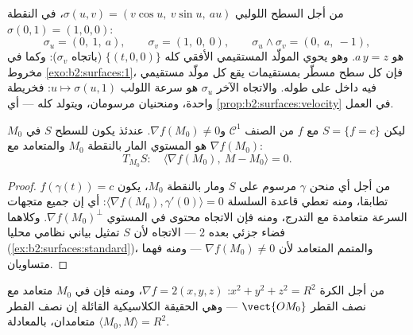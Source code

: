 \begin{example}
\label{ex:b2:surfaces:helicoidtangent}
من أجل السطح اللولبي $\sigma(u, v) = (v\cos u,\ v\sin u,\ au)$، في النقطة $\sigma(0, 1) = (1, 0, 0)$:
\[
\sigma_u = (0,\ 1,\ a), \qquad \sigma_v = (1,\ 0,\ 0),
\qquad
\sigma_u \wedge \sigma_v = (0,\ a,\ -1),
\]
 هو $a\,y = z$. وهو يحوي المولّد المستقيمي الأفقي كله
$\{(t, 0, 0)\}$ (باتجاه $\sigma_v$): وكما في مخروط \cref{exo:b2:surfaces:1}، فإن كل سطح مسطّر
بمستقيمات يقع كل مولّد مستقيمي فيه داخل  على طوله.
والاتجاه  الآخر $\sigma_u$ هو سرعة اللولب $u \mapsto \sigma(u, 1)$: فخريطة واحدة،
ومنحنيان مرسومان، ويتولد  كله --- أي \cref{prop:b2:surfaces:velocity} في العمل.
\end{example}

\begin{proposition}\label{prop:b2:surfaces:gradient}
ليكن $S = \{f = c\}$ مع $f$ من الصنف $\mathcal{C}^1$ و$\nabla
f(M_0) \neq 0$. عندئذ يكون  للسطح $S$ في $M_0$ هو المستوي المار بالنقطة $M_0$
والمتعامد مع $\nabla f(M_0)$:
\[
T_{M_0}S :\quad
\langle \nabla f(M_0),\ M - M_0\rangle = 0 .
\]
\end{proposition}

\begin{proof}
من أجل أي منحن $\gamma$ مرسوم على $S$ ومار بالنقطة $M_0$، يكون
$f(\gamma(t)) =
c$ تطابقا، ومنه تعطي قاعدة السلسلة $\langle
\nabla f(M_0), \gamma'(0)\rangle = 0$: أي إن جميع متجهات السرعة
متعامدة مع التدرج، ومنه فإن الاتجاه  محتوى في المستوي $\nabla f(M_0)^\perp$.
وكلاهما فضاء جزئي بعده $2$ --- الاتجاه  لأن $S$ تمثيل
بياني نظامي محليا (\cref{ex:b2:surfaces:standard})، والمتمم المتعامد لأن $\nabla f(M_0) \neq 0$ --- ومنه فهما
متساويان.
\end{proof}

\begin{example}\label{ex:b2:surfaces:spheretangent}
من أجل الكرة $x^2 + y^2 + z^2 = R^2$: $\nabla f = 2(x, y, z)$، ومنه فإن  في $M_0$ متعامد
مع نصف القطر $\vect{OM_0}$ --- وهي الحقيقة الكلاسيكية القائلة إن نصف القطر
 متعامدان، بالمعادلة $\langle M_0, M\rangle = R^2$.
\end{example}

